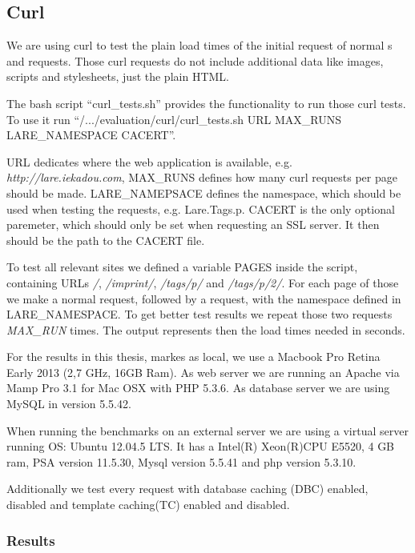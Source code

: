 \subsection{Curl\label{curl}}

We are using curl to test the plain load times of the initial request of normal \httpRequest{}s and \lare{} requests.
Those curl requests do not include additional data like images, scripts and stylesheets, just the plain HTML.

The bash script \enquote{curl\_tests.sh} provides the functionality to run those curl tests.
To use it run 
\enquote{/.../evaluation/curl/curl\_tests.sh URL MAX\_RUNS LARE\_NAMESPACE CACERT}.

URL dedicates where the web application is available, e.g. \emph{http://lare.iekadou.com}, MAX\_RUNS defines how many curl requests per page should be made.
LARE\_NAMEPSACE defines the namespace, which should be used when testing the \lare{} requests, e.g. Lare.Tags.p.
CACERT is the only optional paremeter, which should only be set when requesting an SSL server. It then should be the path to the CACERT file.


To test all relevant sites we defined a variable PAGES inside the script, containing URLs \emph{/}, \emph{/imprint/}, \emph{/tags/p/} and \emph{/tags/p/2/}.
For each page of those we make a normal request, followed by a \lare{} request, with the namespace defined in LARE\_NAMESPACE. 
To get better test results we repeat those two requests \emph{MAX\_RUN} times. The output represents then the load times needed in seconds.

For the results in this thesis, markes as local, we use a Macbook Pro Retina Early 2013 (2,7 GHz, 16GB Ram).
As web server we are running an Apache via Mamp Pro 3.1 for Mac OSX with PHP 5.3.6.
As database server we are using MySQL in version 5.5.42.

When running the benchmarks on an external server we are using a virtual server running OS: Ubuntu 12.04.5 LTS.
It has a Intel(R) Xeon(R)CPU E5520, 4 GB ram, PSA version 11.5.30, Mysql version 5.5.41 and php version 5.3.10.

Additionally we test every request with database caching (DBC) enabled, disabled and template caching(TC) enabled and disabled.

\subsubsection{Results}

